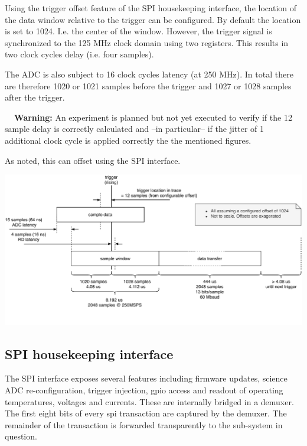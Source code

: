 \documentclass[a4paper,indent]{paper}
\newenvironment{warning}
{\par\begin{mdframed}[linewidth=2pt,linecolor=orange,backgroundcolor=orange!10]%
    \begin{list}{}{\leftmargin=0mm}\item[\bf\danger{}~~Warning: ]}
  {\end{list}\end{mdframed}\par}
\begin{document}
Using the trigger offset feature of the SPI housekeeping interface, the location of the data window relative to the trigger can be configured. By default the location is set to 1024. I.e. the center of the window. However, the trigger signal is synchronized to the 125 MHz clock domain using two registers. This results in two clock cycles delay (i.e. four samples).

The ADC is also subject to 16 clock cycles latency (at 250 MHz). In total there are therefore 1020 or 1021 samples before the trigger and 1027 or 1028 samples after the trigger.

\begin{warning}
  An experiment is planned but not yet executed to verify if the 12 sample delay is correctly calculated and --in particular-- if the jitter of 1 additional clock cycle is applied correctly the the mentioned figures.
\end{warning}

As noted, this can offset using the SPI interface. 

\begin{center}
  \includegraphics[width=\textwidth]{img/rd_timing.pdf}
  \label{fig:rd_timing}
\end{center}

\subsection{SPI housekeeping interface}

The SPI interface exposes several features including firmware updates, science ADC re-configuration, trigger injection, gpio access and readout of operating temperatures, voltages and currents. 
These are internally bridged in a demuxer. The first eight bits of every spi transaction are captured by the demuxer. The remainder of the transaction is forwarded transparently to the sub-system in question.
\end{document}
